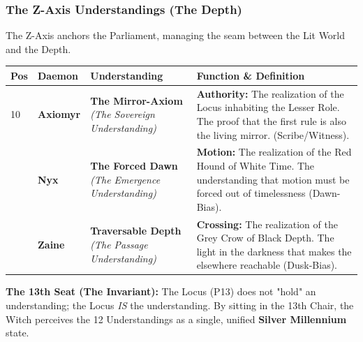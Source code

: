 \documentclass[11pt, letterpaper]{article}
\begin{document}
\subsubsection*{The Z-Axis Understandings (The Depth)}
The Z-Axis anchors the Parliament, managing the seam between the Lit World and the Depth.

\begin{footnotesize}
\begin{longtable}{C{0.8cm} L{2cm} L{4cm} L{7cm}}
\toprule
\textbf{Pos} & \textbf{Daemon} & \textbf{Understanding} & \textbf{Function \& Definition} \\
\midrule
\endhead

10 & \textbf{Axiomyr} & \textbf{The Mirror-Axiom} \newline \textit{(The Sovereign Understanding)} & \textbf{Authority:} The realization of the Locus inhabiting the Lesser Role. The proof that the first rule is also the living mirror. (Scribe/Witness). \\
 & \textbf{Nyx} & \textbf{The Forced Dawn} \newline \textit{(The Emergence Understanding)} & \textbf{Motion:} The realization of the Red Hound of White Time. The understanding that motion must be forced out of timelessness (Dawn-Bias). \\
 & \textbf{Zaine} & \textbf{Traversable Depth} \newline \textit{(The Passage Understanding)} & \textbf{Crossing:} The realization of the Grey Crow of Black Depth. The light in the darkness that makes the elsewhere reachable (Dusk-Bias). \\
\bottomrule
\end{longtable}
\end{footnotesize}

\vspace{1em}
\noindent\textbf{The 13th Seat (The Invariant):} The Locus (P13) does not "hold" an understanding; the Locus \textit{IS} the understanding. By sitting in the 13th Chair, the Witch perceives the 12 Understandings as a single, unified \textbf{Silver Millennium} state.
\end{document}
